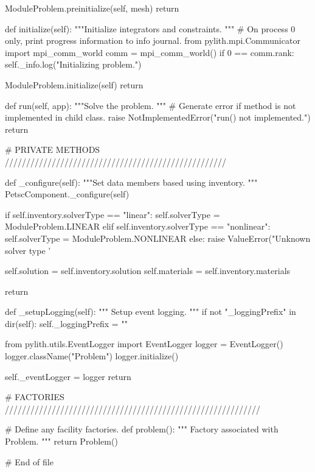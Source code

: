 \begin{python}
        ModuleProblem.preinitialize(self, mesh)
        return

    def initialize(self):
        """Initialize integrators and constraints.
        """
        # On process 0 only, print progress information to info journal.
        from pylith.mpi.Communicator import mpi_comm_world
        comm = mpi_comm_world()
        if 0 == comm.rank:
            self._info.log("Initializing problem.")

        ModuleProblem.initialize(self)
        return

    def run(self, app):
        """Solve the problem.
        """
        # Generate error if method is not implemented in child class.
        raise NotImplementedError("run() not implemented.")
        return

    # PRIVATE METHODS ////////////////////////////////////////////////////

    def _configure(self):
        """Set data members based using inventory.
        """
        PetscComponent._configure(self)

        if self.inventory.solverType == "linear":
            self.solverType = ModuleProblem.LINEAR
        elif self.inventory.solverType == "nonlinear":
            self.solverType = ModuleProblem.NONLINEAR
        else:
            raise ValueError("Unknown solver type '%

        self.solution = self.inventory.solution
        self.materials = self.inventory.materials

        return

    def _setupLogging(self):
        """
        Setup event logging.
        """
        if not "_loggingPrefix" in dir(self):
            self._loggingPrefix = ""

        from pylith.utils.EventLogger import EventLogger
        logger = EventLogger()
        logger.className("Problem")
        logger.initialize()

        self._eventLogger = logger
        return


# FACTORIES ////////////////////////////////////////////////////////////

# Define any facility factories.
def problem():
    """
    Factory associated with Problem.
    """
    return Problem()


# End of file
\end{python}
